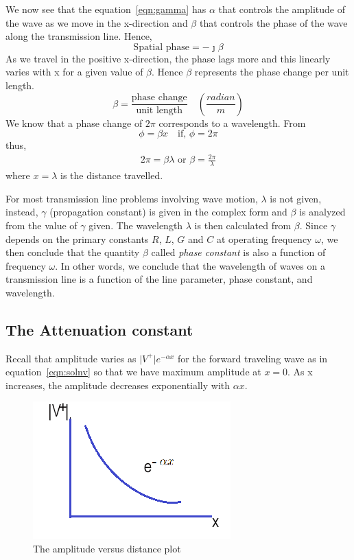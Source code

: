 We now see that the equation~\eqref{eqn:gamma} has $\alpha$ that controls the amplitude of the wave as we move in the x-direction and $\beta$ that controls the phase of the wave along the transmission line. Hence,
\begin{equation}
\text{Spatial phase} = -\jmath\beta
\end{equation}
As we travel in the positive x-direction, the phase lags more and this linearly varies with x for a given value of $\beta$. Hence $\beta$ represents the phase change per unit length.
\begin{equation}
\beta = \frac{\text{phase change}}{\text{unit length}} \quad\left(\frac{radian}{m}\right)
\label{eqn:phaseconstant}
\end{equation}
We know that a phase change of $2\pi$ corresponds to a wavelength. From
\begin{equation*}
\phi = \beta x \quad\text{if, }\phi = 2\pi
\end{equation*}
thus,
\begin{align*}
2\pi = \beta\lambda\text{ or }\beta = \frac{2\pi}{\lambda}
\end{align*}
where $ x = \lambda $ is the distance travelled.

For most transmission line problems involving wave motion, $\lambda$ is not given, instead, $\gamma$ (propagation constant) is given in the complex form and $\beta$ is analyzed from the value of $\gamma$ given. The wavelength $\lambda$ is then calculated from $\beta$. Since $\gamma$ depends on the primary constants $R$, $L$, $G$ and $C$ at operating frequency $\omega$, we then conclude that the quantity $\beta$ called \emph{phase constant} is also a function of frequency $\omega$. In other words, we conclude that the wavelength of waves on a transmission line is a function of the line parameter, phase constant, and wavelength.

\subsection{The Attenuation constant}
Recall that amplitude varies as $\lvert V^+\rvert e^{-\alpha x}$ for the forward traveling wave as in equation~\eqref{eqn:solnv} so that we have maximum amplitude at $x = 0$. As x increases, the amplitude decreases exponentially with $\alpha x$. 
\begin{figure}[h]
\centering
\includegraphics[width=0.7\linewidth]{./graphics/VversusXcurve}
\caption{The amplitude versus distance plot}
\label{fig:VversusXcurve}
\end{figure}

